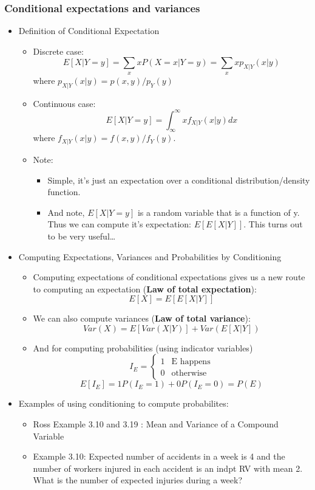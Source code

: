 \documentclass[12pt]{report}
\begin{document}
\subsubsection*{Conditional expectations and variances}
\label{sec-1-1-7}
\begin{itemize}
\item Definition of Conditional Expectation
\label{sec-1-1-7-1}
\begin{itemize}
\item Discrete case:
\label{sec-1-1-7-1-1}
$$E[X|Y=y] = \sum_x x P(X=x|Y=y) = \sum_x x p_{X|Y}(x|y)$$
where $p_{X|Y}(x|y) = p(x,y)/p_Y(y)$
\item Continuous case:
\label{sec-1-1-7-1-2}
$$E[X|Y=y] = \int_{\infty}^{\infty} x f_{X|Y}(x|y)dx $$
where $f_{X|Y}(x|y) = f(x,y)/f_Y(y)$.
\item Note:
\label{sec-1-1-7-1-3}
\begin{itemize}
\item Simple, it's just an expectation over a conditional distribution/density function.
\item And note, $E[X|Y=y]$ is a random variable that is a function of y.  Thus we can
compute it's expectation:  $E[E[X|Y]]$. This turns out to be very useful\ldots{}
\end{itemize}
\end{itemize}
\item Computing Expectations, Variances and Probabilities by Conditioning
\label{sec-1-1-7-2}
\begin{itemize}
\item Computing expectations of conditional expectations gives us a new route to computing an expectation 
(\textbf{Law of total expectation}): 
$$E[X]= E[E[X|Y]]$$
\label{sec-1-1-7-2-1}
\item We can also compute variances (\textbf{Law of total variance}): $$Var(X)=E[Var(X|Y)]+Var(E[X|Y])$$
\label{sec-1-1-7-2-2}
\item And for computing probabilities (using indicator variables)
$$
I_E=
\begin{cases}
1 & \text{E happens}\\
0 & \text{otherwise}
\end{cases}
$$
$$
E[I_E]=1P(I_E=1) + 0P(I_E=0)=P(E)
$$
\label{sec-1-1-7-2-3}
\end{itemize}
\item Examples of using conditioning to compute probabilites:
\label{sec-1-1-7-3}
\begin{itemize}
\item Ross Example 3.10 and 3.19 : Mean and Variance of a Compound Variable
\label{sec-1-1-7-3-1}
\item Example 3.10: Expected number of accidents in a week is 4 and the number of  workers injured in each accident is an indpt RV with mean 2. What is the  number of expected injuries during a week?
\label{sec-1-1-7-3-1-1}




\end{itemize}
\end{itemize}
\end{document}
